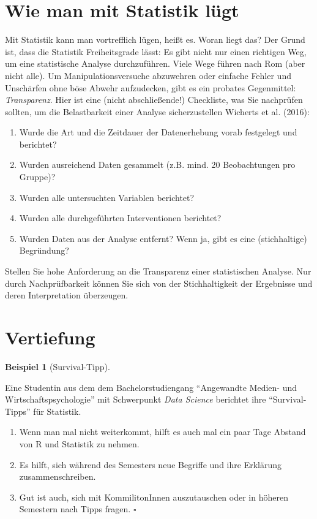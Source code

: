 \documentclass[
  letterpaper,
  oneside,
  open=any]{scrbook}
\providecommand{\tightlist}{%
  \setlength{\itemsep}{0pt}\setlength{\parskip}{0pt}}\usepackage{longtable,booktabs,array}
\theoremstyle{definition}
\theoremstyle{definition}
\newtheorem{example}{Beispiel}[chapter]
\theoremstyle{definition}
\theoremstyle{remark}
\begin{document}
\section{Wie man mit Statistik
lügt}\label{wie-man-mit-statistik-luxfcgt-2}

Mit Statistik kann man vortrefflich lügen, heißt es. Woran liegt das?
Der Grund ist, dass die Statistik Freiheitsgrade lässt: Es gibt nicht
nur einen richtigen Weg, um eine statistische Analyse durchzuführen.
Viele Wege führen nach Rom (aber nicht alle). Um Manipulationsversuche
abzuwehren oder einfache Fehler und Unschärfen ohne böse Abwehr
aufzudecken, gibt es ein probates Gegenmittel: \emph{Transparenz}. Hier
ist eine (nicht abschließende!) Checkliste, was Sie nachprüfen sollten,
um die Belastbarkeit einer Analyse sicherzustellen Wicherts et al.
(2016):

\begin{enumerate}
\def\labelenumi{\arabic{enumi}.}
\tightlist
\item
  Wurde die Art und die Zeitdauer der Datenerhebung vorab festgelegt und
  berichtet?
\item
  Wurden ausreichend Daten gesammelt (z.B. mind. 20 Beobachtungen pro
  Gruppe)?
\item
  Wurden alle untersuchten Variablen berichtet?
\item
  Wurden alle durchgeführten Interventionen berichtet?
\item
  Wurden Daten aus der Analyse entfernt? Wenn ja, gibt es eine
  (stichhaltige) Begründung?
\end{enumerate}

\label{callout-important}
Stellen Sie hohe Anforderung an die Transparenz einer statistischen
Analyse. Nur durch Nachprüfbarkeit können Sie sich von der
Stichhaltigkeit der Ergebnisse und deren Interpretation überzeugen.

\section{Vertiefung}\label{vertiefung-5}

\begin{example}[Survival-Tipp]\protect\hypertarget{exm-survival1}{}\label{exm-survival1}

Eine Studentin aus dem dem Bachelorstudiengang \enquote{Angewandte
Medien- und Wirtschaftspsychologie} mit Schwerpunkt \emph{Data Science}
berichtet ihre \enquote{Survival-Tipps} für Statistik.

\begin{enumerate}
\def\labelenumi{\arabic{enumi}.}
\tightlist
\item
  Wenn man mal nicht weiterkommt, hilft es auch mal ein paar Tage
  Abstand von R und Statistik zu nehmen.
\item
  Es hilft, sich während des Semesters neue Begriffe und ihre Erklärung
  zusammenschreiben.
\item
  Gut ist auch, sich mit KommilitonInnen auszutauschen oder in höheren
  Semestern nach Tipps fragen. \(\square\)
\end{enumerate}

\end{example}
\end{document}
